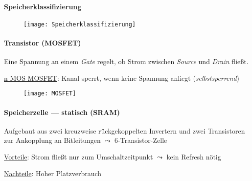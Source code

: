 \paragraph{Speicherklassifizierung}
\begin{figure}[H]\centering\label{Speicherklassifizierung}\texttt{[image: Speicherklassifizierung]}\end{figure}

\newpage

\paragraph{Transistor (MOSFET)}
\begin{items}
	\item Eine Spannung an einem \emph{Gate} regelt, ob Strom zwischen \emph{Source} und \emph{Drain} fließt.
	\item \underline{n-MOS-MOSFET}: Kanal sperrt, wenn keine Spannung anliegt (\emph{selbstsperrend})
\end{items}
\begin{figure}[H]\centering\label{MOSFET}\texttt{[image: MOSFET]}\end{figure}

\paragraph{Speicherzelle --- statisch (SRAM)}
\begin{items}
	\item Aufgebaut aus zwei kreuzweise rückgekoppelten Invertern und zwei Transistoren zur Ankopplung an Bitleitungen \( \leadsto \) 6-Transistor-Zelle
	\item \underline{Vorteile}: Strom fließt nur zum Umschaltzeitpunkt \( \leadsto \) kein Refresh nötig
	\item \underline{Nachteile}: Hoher Platzverbrauch
\end{items}

